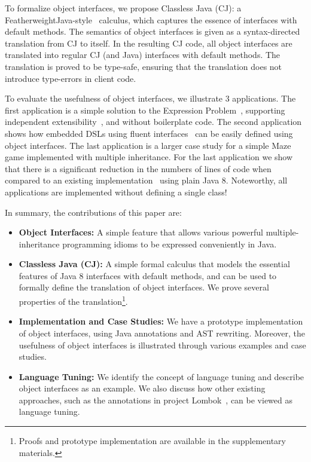 To formalize object interfaces, we propose Classless Java (CJ): a
FeatherweightJava-style~\cite{Igarashi01FJ} calculus, which captures the essence
of interfaces with default methods. The semantics of object interfaces
is given as a syntax-directed translation from CJ to itself. In the
resulting CJ code, all object interfaces are translated into regular CJ
(and Java) interfaces with default methods. The translation is proved
to be type-safe, ensuring that the translation does not
introduce type-errors in client code. 

To evaluate the usefulness of object interfaces, we illustrate 3
applications. The first application is a simple 
solution to the Expression Problem~\cite{wadler98expression}, supporting independent 
extensibility~\cite{zenger05independentlyextensible}, and without boilerplate code. The second
application shows how embedded DSLs using fluent interfaces~\cite{fowler2005fluentinterface} 
can be easily defined using object interfaces. The last
application is a larger case study for a simple Maze game implemented with 
multiple inheritance. For the last application we show that there is a
significant reduction in the numbers of lines of code when compared 
to an existing implementation~\cite{bono14} using plain Java 8. 
Noteworthy, all applications are implemented 
without defining a single class!

In summary, the contributions of this paper are:
\begin{itemize}

\item {\bf Object Interfaces:} A simple feature that allows various
  powerful multiple-inheritance programming idioms to be expressed
  conveniently in Java.

\item {\bf Classless Java (CJ):} A simple formal calculus that models 
the essential features of Java 8 interfaces with default methods, and 
can be used to formally define the translation of object interfaces. 
We prove several properties of the translation\footnote{Proofs and prototype implementation are available in
  the supplementary materials.}.

\item {\bf Implementation and Case Studies:} We have a prototype
  implementation of object interfaces, using Java
  annotations and AST rewriting. Moreover, the usefulness of object interfaces is
  illustrated through various examples and case studies.

\item{\bf Language Tuning:} We identify the concept of language tuning 
and describe object interfaces as an example. We also discuss 
how other existing approaches, such as the annotations in project 
Lombok~\cite{lombok},  can be viewed as language tuning.

\end{itemize}
